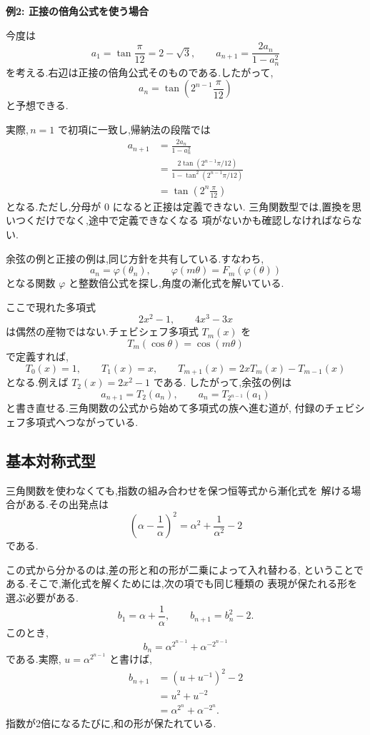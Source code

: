 \textbf{例2: 正接の倍角公式を使う場合}

今度は
\[
  a_1=\tan\frac{\pi}{12}=2-\sqrt{3},
  \qquad
  a_{n+1}=\frac{2a_n}{1-a_n^2}
  \tag{2.7.5}
\]
を考える.右辺は正接の倍角公式そのものである.したがって,
\[
  a_n=\tan\left(2^{n-1}\frac{\pi}{12}\right)
  \tag{2.7.6}
\]
と予想できる.

実際,\,$n=1$ で初項に一致し,帰納法の段階では
\begin{align*}
  a_{n+1}
    &=\frac{2a_n}{1-a_n^2}\\
    &=\frac{2\tan(2^{n-1}\pi/12)}
            {1-\tan^2(2^{n-1}\pi/12)}\\
    &=\tan\left(2^n\frac{\pi}{12}\right)
\end{align*}
となる.ただし,分母が $0$ になると正接は定義できない.
三角関数型では,置換を思いつくだけでなく,途中で定義できなくなる
項がないかも確認しなければならない.

余弦の例と正接の例は,同じ方針を共有している.すなわち,
\[
  a_n=\varphi(\theta_n),
  \qquad
  \varphi(m\theta)=F_m(\varphi(\theta))
\]
となる関数 $\varphi$ と整数倍公式を探し,角度の漸化式を解いている.

ここで現れた多項式
\[
  2x^2-1,
  \qquad
  4x^3-3x
\]
は偶然の産物ではない.チェビシェフ多項式 $T_m(x)$ を
\[
  T_m(\cos\theta)=\cos(m\theta)
  \tag{2.7.7}
\]
で定義すれば,
\[
  T_0(x)=1,
  \qquad
  T_1(x)=x,
  \qquad
  T_{m+1}(x)=2xT_m(x)-T_{m-1}(x)
\]
となる.例えば $T_2(x)=2x^2-1$ である.
したがって,余弦の例は
\[
  a_{n+1}=T_2(a_n),
  \qquad
  a_n=T_{2^{n-1}}(a_1)
\]
と書き直せる.三角関数の公式から始めて多項式の族へ進む道が,
付録のチェビシェフ多項式へつながっている.

\subsection{基本対称式型}

三角関数を使わなくても,指数の組み合わせを保つ恒等式から漸化式を
解ける場合がある.その出発点は
\[
  \left(\alpha-\frac{1}{\alpha}\right)^2
  =\alpha^2+\frac{1}{\alpha^2}-2
  \tag{2.7.8}
\]
である.

この式から分かるのは,差の形と和の形が二乗によって入れ替わる,
ということである.そこで,漸化式を解くためには,次の項でも同じ種類の
表現が保たれる形を選ぶ必要がある.
\[
  b_1=\alpha+\frac{1}{\alpha},
  \qquad
  b_{n+1}=b_n^2-2.
  \tag{2.7.9}
\]
このとき,
\[
  b_n=\alpha^{2^{n-1}}+\alpha^{-2^{n-1}}
  \tag{2.7.10}
\]
である.実際, $u=\alpha^{2^{n-1}}$ と書けば,
\begin{align*}
  b_{n+1}
    &=\left(u+u^{-1}\right)^2-2\\
    &=u^2+u^{-2}\\
    &=\alpha^{2^n}+\alpha^{-2^n}.
\end{align*}
指数が2倍になるたびに,和の形が保たれている.

